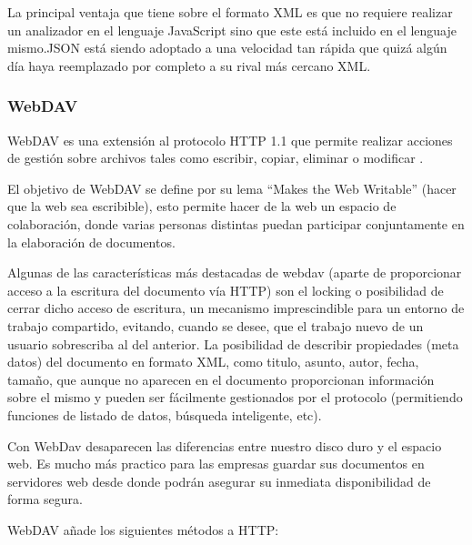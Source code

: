 La principal ventaja que tiene sobre el formato XML es que no requiere realizar un analizador en el lenguaje JavaScript sino que este está incluido en el lenguaje mismo.\newline JSON está siendo adoptado a una velocidad tan rápida que quizá algún día haya reemplazado por completo a su rival más cercano XML.


\subsubsection{WebDAV}
\label{tec:webdav}

WebDAV \cite{webdav} es una extensión al protocolo HTTP 1.1 que permite realizar acciones de gestión sobre archivos tales como escribir, copiar, eliminar o modificar \cite{webdav_rfc}.

El objetivo de WebDAV se define por su lema ``Makes the Web Writable'' (hacer que la web sea escribible), esto permite hacer de la web un espacio de colaboración, donde varias personas distintas puedan participar conjuntamente en la elaboración de documentos.

Algunas de las características más destacadas de webdav (aparte de proporcionar acceso a la escritura del documento vía HTTP) son el locking o posibilidad de cerrar dicho acceso de escritura, un mecanismo imprescindible para un entorno de trabajo compartido, evitando, cuando se desee, que el trabajo nuevo de un usuario sobrescriba al del anterior. La posibilidad de describir propiedades (meta datos) del documento en formato XML, como titulo, asunto, autor, fecha, tamaño, que aunque no aparecen en el documento proporcionan información sobre el mismo y pueden ser fácilmente gestionados por el protocolo (permitiendo funciones de listado de datos, búsqueda inteligente, etc).

Con WebDav desaparecen las diferencias entre nuestro disco duro y el espacio web. Es mucho más practico para las empresas guardar sus documentos en servidores web desde donde podrán asegurar su inmediata disponibilidad de forma segura.

WebDAV añade los siguientes métodos a HTTP:


